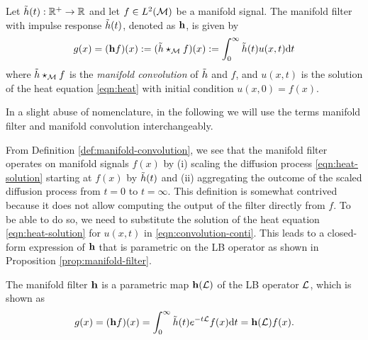 \begin{definition}
\label{def:manifold-convolution}
Let ${\tilde h}(t):{\mathbb R}^+ \to {\mathbb R}$ and let $f \in L^2({\mathcal M})$ be a manifold signal. The manifold filter with impulse response ${\tilde h}(t)$, denoted as ${\mathbf h}$, is given by
%
\begin{align} \label{eqn:convolution-conti}
   g(x) = ({\mathbf h} f)(x) := ({\tilde h} \star_{\mathcal M} f) (x) := \int_0^\infty {\ensuremath{\tilde h}}(t)u(x,t)\text{d}t 
\end{align}
%
where ${\tilde h} \star_{\mathcal M} f$ is the \emph{manifold convolution} of ${\tilde h}$ and $f$, and $u(x,t)$ is the solution of the heat equation \eqref{eqn:heat} with initial condition $u(x,0)=f(x)$. 
\end{definition}

In a slight abuse of nomenclature, in the following we will use the terms manifold filter and manifold convolution interchangeably.

From Definition \ref{def:manifold-convolution}, we see that the manifold filter operates on manifold signals $f(x)$ by (i) scaling the diffusion process \eqref{eqn:heat-solution} starting at $f(x)$ by ${\tilde h}(t)$ and (ii) aggregating the outcome of the scaled diffusion process from $t=0$ to $t=\infty$. This definition is somewhat contrived because it does not allow computing the output of the filter directly from $f$. To be able to do so, we need to substitute the solution of the heat equation \eqref{eqn:heat-solution} for $u(x,t)$ in \eqref{eqn:convolution-conti}. This leads to a closed-form expression of ${\mathbf h}$ that is parametric on the LB operator as shown in Proposition \ref{prop:manifold-filter}.


\begin{proposition}
\label{prop:manifold-filter}
The manifold filter ${\mathbf h}$ is a parametric map ${\mathbf h}({\mathcal L})$ of the LB operator ${\mathcal L}$, which is shown as
\begin{equation} \label{eqn:manifold-conv-spatial}
   g(x) = ({\mathbf h} f)(x) =\int_0^\infty {\ensuremath{\tilde h}}(t)e^{-t{\mathcal L}}f(x)\text{d}t =  {\mathbf h}({\mathcal L})f(x) \text{.}
\end{equation}
\end{proposition}

